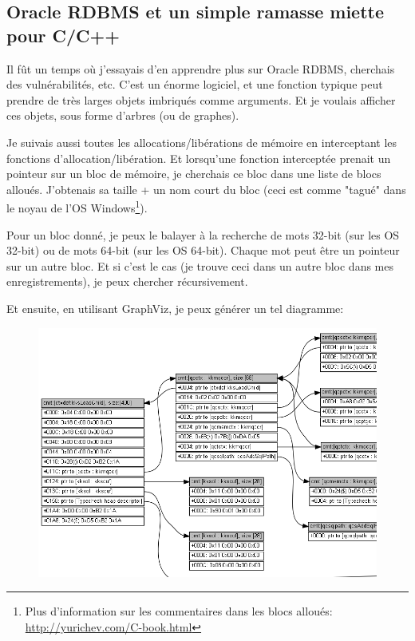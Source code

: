 \subsection{Oracle RDBMS et un simple ramasse miette pour C/C++}

Il fût un temps où j'essayais d'en apprendre plus sur Oracle RDBMS, cherchais des vulnérabilités, etc.
C'est un énorme logiciel, et une fonction typique peut prendre de très larges objets
imbriqués comme arguments.
Et je voulais afficher ces objets, sous forme d'arbres (ou de graphes).

Je suivais aussi toutes les allocations/libérations de mémoire en interceptant les
fonctions d'allocation/libération.
Et lorsqu'une fonction interceptée prenait un pointeur sur un bloc de mémoire, je
cherchais ce bloc dans une liste de blocs alloués.
J'obtenais sa taille + un nom court du bloc
(ceci est comme "tagué" dans le noyau de l'OS Windows\footnote{Plus d'information
sur les commentaires dans les blocs alloués:  \CNotes{} \url{http://yurichev.com/C-book.html}}).

Pour un bloc donné, je peux le balayer à la recherche de mots 32-bit (sur les OS
32-bit) ou de mots 64-bit (sur les OS 64-bit).
Chaque mot peut être un pointeur sur un autre bloc.
Et si c'est le cas (je trouve ceci dans un autre bloc dans mes enregistrements),
je peux chercher récursivement.

Et ensuite, en utilisant GraphViz, je peux générer un tel diagramme:

\begin{figure}[H]
\centering
\includegraphics[width=\textwidth]{advanced/450_more_ptrs/oracle2_crop.png}
\end{figure}


